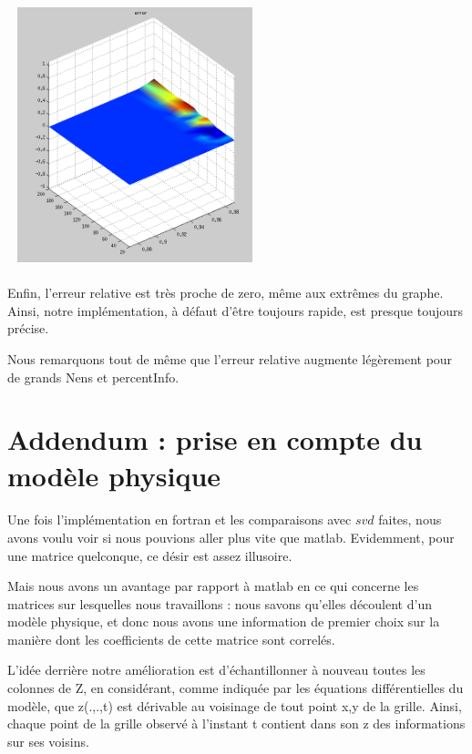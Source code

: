 \documentclass[a4paper,12pt]{article}
\begin{document}
    \bigskip
    \begin{center}
    \includegraphics[width=20em, height=20em]{error.png}
    \end{center}

    \paragraph{}
    Enfin, l'erreur relative est très proche de zero, même aux extrêmes du graphe.
    Ainsi, notre implémentation, à défaut d'être toujours rapide, est presque toujours
    précise.

    Nous remarquons tout de même que l'erreur relative augmente légèrement pour de
    grands Nens et percentInfo.

\newpage
\section{Addendum : prise en compte du modèle physique}

    \paragraph{}
    Une fois l'implémentation en fortran et les comparaisons avec $svd$ faites,
    nous avons voulu voir si nous pouvions aller plus vite que matlab. Evidemment,
    pour une matrice quelconque, ce désir est assez illusoire.

    Mais nous avons un avantage par rapport à matlab en ce qui concerne les
    matrices sur lesquelles nous travaillons : nous savons qu'elles découlent
    d'un modèle physique, et donc nous avons une information de premier choix
    sur la manière dont les coefficients de cette matrice sont correlés.

    L'idée derrière notre amélioration est d'échantillonner à nouveau toutes les
    colonnes de Z, en considérant, comme indiquée par les équations différentielles
    du modèle, que z(.,.,t) est dérivable au voisinage de tout point x,y de la grille.
    Ainsi, chaque point de la grille observé à l'instant t contient dans son z des
    informations sur ses voisins.
\end{document}
